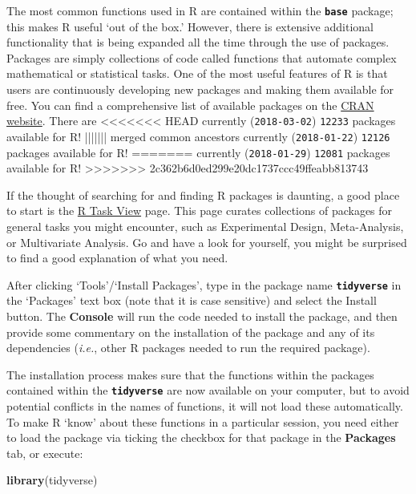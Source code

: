 \documentclass[]{book}
\newenvironment{Shaded}{\begin{snugshade}}{\end{snugshade}}
\newcommand{\KeywordTok}[1]{\textcolor[rgb]{0.13,0.29,0.53}{\textbf{#1}}}
\newcommand{\NormalTok}[1]{#1}
\theoremstyle{definition}
\theoremstyle{definition}
\theoremstyle{definition}
\theoremstyle{remark}
\begin{document}
The most common functions used in R are contained within the
\textbf{\texttt{base}} package; this makes R useful `out of the box.'
However, there is extensive additional functionality that is being
expanded all the time through the use of packages. Packages are simply
collections of code called functions that automate complex mathematical
or statistical tasks. One of the most useful features of R is that users
are continuously developing new packages and making them available for
free. You can find a comprehensive list of available packages on the
\href{https://cran.r-project.org/web/packages/}{CRAN website}. There are
<<<<<<< HEAD
currently (\texttt{2018-03-02}) \texttt{12233} packages available for R!
||||||| merged common ancestors
currently (\texttt{2018-01-22}) \texttt{12126} packages available for R!
=======
currently (\texttt{2018-01-29}) \texttt{12081} packages available for R!
>>>>>>> 2c362b6d0ed299e20dc1737ccc49ffeabb813743

If the thought of searching for and finding R packages is daunting, a
good place to start is the \href{http://cran.r-project.org/web/views/}{R
Task View} page. This page curates collections of packages for general
tasks you might encounter, such as Experimental Design, Meta-Analysis,
or Multivariate Analysis. Go and have a look for yourself, you might be
surprised to find a good explanation of what you need.

After clicking `Tools'/`Install Packages', type in the package name
\textbf{\texttt{tidyverse}} in the `Packages' text box (note that it is
case sensitive) and select the Install button. The \textbf{Console} will
run the code needed to install the package, and then provide some
commentary on the installation of the package and any of its
dependencies (\emph{i.e.}, other R packages needed to run the required
package).

The installation process makes sure that the functions within the
packages contained within the \textbf{\texttt{tidyverse}} are now
available on your computer, but to avoid potential conflicts in the
names of functions, it will not load these automatically. To make R
`know' about these functions in a particular session, you need either to
load the package via ticking the checkbox for that package in the
\textbf{Packages} tab, or execute:

\begin{Shaded}
\begin{Highlighting}[]
\KeywordTok{library}\NormalTok{(tidyverse)}
\end{Highlighting}
\end{Shaded}
\end{document}
